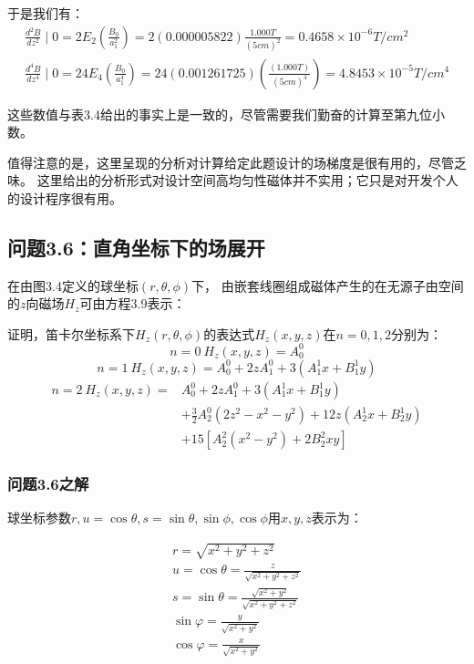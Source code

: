 于是我们有：
\begin{eqnarray}%
\frac{d^2B}{dz^2}\mid0=2E_2(\frac{B_0}{a_{1}^{2}})=2(0.000005822)\frac{1.000T}{(5 cm)^2}=0.4658\times10^{-6}T/cm^2\\
\frac{d^4B}{dz^4}\mid0=24E_4(\frac{B_0}{a_{1}^{4}})=24(0.001261725)(\frac{(1.000T)}{(5 cm)^4})=4.8453\times10^{-5}T/cm^4
\end{eqnarray}

这些数值与表3.4给出的事实上是一致的，尽管需要我们勤奋的计算至第九位小数。

值得注意的是，这里呈现的分析对计算给定此题设计的场梯度是很有用的，尽管乏味。
这里给出的分析形式对设计空间高均匀性磁体并不实用；它只是对开发个人的设计程序很有用。
\newpage


\subsection{问题3.6：直角坐标下的场展开}
在由图3.4定义的球坐标$(r, \theta,\phi)$下，
由嵌套线圈组成磁体产生的在无源子由空间的$z$向磁场$H_z$可由方程3.9表示：

证明，笛卡尔坐标系下$H_z(r, \theta,\phi)$的表达式$H_z(x, y, z)$在$n=0, 1, 2$分别为：
\begin{equation}%
n=0\ H_z(x,y,z)=A_{0}^{0}
\end{equation}
\begin{equation}
n=1\ H_z(x,y,z)=A_{0}^{0}+2zA_{1}^{0}+3(A_{1}^{1}x+B_{1}^{1}y)
\end{equation}
\begin{equation}
\begin{split}
n=2\ H_z(x,y,z)=&A_{0}^{0}+2zA_{1}^{0}+3(A_{1}^{1}x+B_{1}^{1}y)\\
&+\frac{3}{2}A_{2}^{0}(2z^2-x^2-y^2)+12z(A_{2}^{1}x+B_{2}^{1}y)\\
&+15[A_{2}^{2}(x^2-y^2)+2B_{2}^{2}xy]
\end{split}
\end{equation}


\subsubsection{问题3.6之解}
球坐标参数$r, u = \cos\theta, s = \sin\theta, \sin\phi,\cos\phi$用$x,y,z$表示为：

 \begin{eqnarray}%
r=\sqrt{x^2+y^2+z^2}\\
u=\cos\theta=\frac{z}{\sqrt{x^2+y^2+z^2}}\\
s=\sin\theta=\frac{\sqrt{x^2+y^2}}{\sqrt{x^2+y^2+z^2}}\\
\sin\varphi=\frac{y}{\sqrt{x^2+y^2}}\\
\cos\varphi=\frac{x}{\sqrt{x^2+y^2}}
\end{eqnarray}

